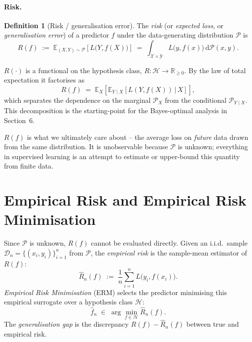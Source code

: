 \documentclass[11pt]{article}
\theoremstyle{definition}
\newtheorem{definition}{Definition}
\begin{document}
\paragraph{Risk.}

\begin{definition}[Risk / generalisation error]
The \emph{risk} (or \emph{expected loss}, or \emph{generalisation error}) of
a predictor $f$ under the data-generating distribution $\mathcal{P}$ is
\[
  R(f) \;:=\; \mathbb{E}_{(X, Y) \sim \mathcal{P}}\!\left[L\bigl(Y, f(X)\bigr)\right]
  \;=\; \int_{\mathcal{X} \times \mathcal{Y}} L\bigl(y, f(x)\bigr) \,\mathrm{d}\mathcal{P}(x, y).
\]
\end{definition}

\begin{mathnote}
$R(\cdot)$ is a functional on the hypothesis class, $R : \mathcal{H} \to
\mathbb{R}_{\geq 0}$. By the law of total expectation it factorises as
\[
  R(f) \;=\; \mathbb{E}_{X}\!\left[
    \mathbb{E}_{Y \mid X}\!\left[L(Y, f(X)) \,\big|\, X\right]
  \right],
\]
which separates the dependence on the marginal $\mathcal{P}_X$ from the
conditional $\mathcal{P}_{Y \mid X}$. This decomposition is the
starting-point for the Bayes-optimal analysis in Section~6.
\end{mathnote}

\begin{mlnote}
$R(f)$ is what we ultimately care about -- the average loss on \emph{future}
data drawn from the same distribution. It is unobservable because
$\mathcal{P}$ is unknown; everything in supervised learning is an attempt
to estimate or upper-bound this quantity from finite data.
\end{mlnote}

\section{Empirical Risk and Empirical Risk Minimisation}

Since $\mathcal{P}$ is unknown, $R(f)$ cannot be evaluated directly. Given an
i.i.d.\ sample $\mathcal{D}_n = \{(x_i, y_i)\}_{i=1}^{n}$ from $\mathcal{P}$,
the \emph{empirical risk} is the sample-mean estimator of $R(f)$:
\[
  \widehat{R}_n(f) \;:=\; \frac{1}{n} \sum_{i=1}^{n} L\bigl(y_i, f(x_i)\bigr).
\]
\emph{Empirical Risk Minimisation} (ERM) selects the predictor minimising
this empirical surrogate over a hypothesis class $\mathcal{H}$:
\[
  \widehat{f}_n \;\in\; \arg\min_{f \in \mathcal{H}} \widehat{R}_n(f).
\]
The \emph{generalisation gap} is the discrepancy $R(f) - \widehat{R}_n(f)$
between true and empirical risk.
\end{document}
